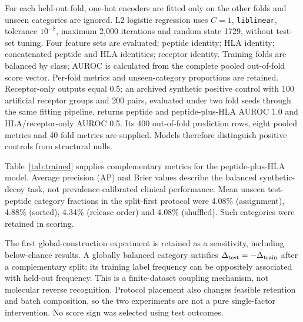 \documentclass[11pt,a4paper]{article}
\begin{document}
For each held-out fold, one-hot encoders are fitted only on the other folds and unseen categories are ignored. L2 logistic regression uses $C=1$, \texttt{liblinear}, tolerance $10^{-8}$, maximum 2,000 iterations and random state 1729, without test-set tuning. Four feature sets are evaluated: peptide identity; HLA identity; concatenated peptide and HLA identities; receptor identity. Training folds are balanced by class; AUROC is calculated from the complete pooled out-of-fold score vector. Per-fold metrics and unseen-category proportions are retained. Receptor-only outputs equal 0.5; an archived synthetic positive control with 100 artificial receptor groups and 200 pairs, evaluated under two fold seeds through the same fitting pipeline, returns peptide and peptide-plus-HLA AUROC 1.0 and HLA/receptor-only AUROC 0.5. Its 400 out-of-fold prediction rows, eight pooled metrics and 40 fold metrics are supplied. Models therefore distinguish positive controls from structural nulls.

Table~\ref{tab:trained} supplies complementary metrics for the peptide-plus-HLA model. Average precision (AP) and Brier values describe the balanced synthetic-decoy task, not prevalence-calibrated clinical performance. Mean unseen test-peptide category fractions in the split-first protocol were 4.08\% (assignment), 4.88\% (sorted), 4.34\% (release order) and 4.08\% (shuffled). Such categories were retained in scoring.
\begin{table}[h]\centering\small
\caption{Trained peptide-plus-HLA control means. AP is average precision. Each source value averages five fold assignments and ten decoy seeds. Matching averages the five deterministic fold assignments; its global construction is fixed.}\label{tab:trained}

\end{table}
The first global-construction experiment is retained as a sensitivity, including below-chance results. A globally balanced category satisfies $\Delta_{\rm test}=-\Delta_{\rm train}$ after a complementary split; its training label frequency can be oppositely associated with held-out frequency. This is a finite-dataset coupling mechanism, not molecular reverse recognition. Protocol placement also changes feasible retention and batch composition, so the two experiments are not a pure single-factor intervention. No score sign was selected using test outcomes.
\end{document}
